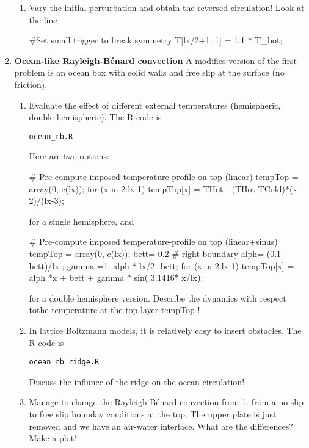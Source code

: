 \documentclass[a4paper,12pt]{article}
\begin{document}
\begin{enumerate}
\begin{enumerate}
 \item
Vary the initial perturbation and obtain the reversed circulation!
Look at the line 

\begin{rcode}
#Set small trigger to break symmetry
T[lx/2+1, 1] = 1.1 * T_bot;   
\end{rcode}

\end{enumerate}


\item
{\bf Ocean-like Rayleigh-B\'{e}nard convection }
A modifies version of the first problem is an ocean box with solid walls and free slip at the surface (no friction).

 \begin{enumerate}
 \item
Evaluate the effect of different external temperatures  (hemispheric, double hemispheric). 
The R code is
\begin{verbatim}
ocean_rb.R
\end{verbatim}

Here are two options: 
\begin{rcode}
# Pre-compute imposed temperature-profile on top (linear)
tempTop = array(0, c(lx));
for (x in 2:lx-1) {
  tempTop[x] = THot - (THot-TCold)*(x-2)/(lx-3);
 }
\end{rcode}
for a single hemisphere, and 
\begin{rcode}
# Pre-compute imposed temperature-profile on top (linear+sinus)
tempTop = array(0, c(lx));
bett= 0.2	# right boundary
alph= (0.1-bett)/lx ;
gamma =1.-alph * lx/2 -bett;
for (x in 2:lx-1) {
	tempTop[x] = alph *x + bett + gamma * sin( 3.1416* x/lx);
}
\end{rcode}
for a double hemisphere version.
Describe the dynamics with respect tothe temperature at the top layer  tempTop !

 \item
 In lattice Boltzmann models, it is relatively easy to insert 
obstacles. The R code is  
\begin{verbatim}
ocean_rb_ridge.R
\end{verbatim}
Discuss the influnce of the ridge on the ocean circulation!


 \item
Manage to change the Rayleigh-B\'{e}nard convection from 1. from a no-slip to   free slip bounday conditions at the top.
The upper plate is just removed and we have an air-water interface.
What are the differences? Make a plot!

\end{enumerate}

\end{enumerate}
\end{document}
